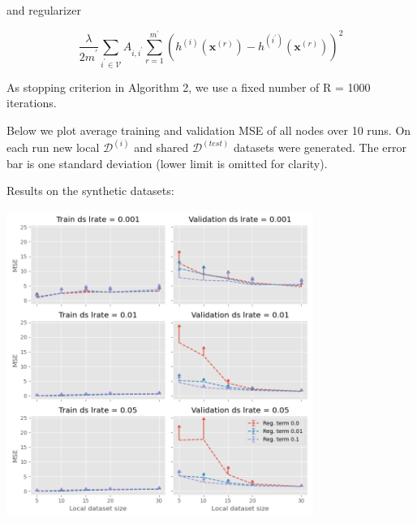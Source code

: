 \documentclass{article}
\begin{document}
and  regularizer 

\begin{equation}
\frac{\lambda}{{2m}^{'}} \sum_{{i}^{'} \in {\mathcal V}} {A}_{i,{i}^{'}} \sum_{r=1}^{{m}^{'}} \left({h}^{(i)}(\mathbf{x}^{(r)}) - {h}^{({i}^{'})}(\mathbf{x}^{(r)}) \right)^2
\end{equation}

As stopping criterion in Algorithm 2, we use a fixed number of R = 1000 iterations. 

Below we plot average training and validation MSE of all nodes over 10 runs. On each run new local $\mathcal{D}^{(i)}$ and shared $\mathcal{D}^{(test)}$ datasets were generated. The error bar is one standard deviation (lower limit is omitted for clarity).  

Results on the synthetic datasets:

\includegraphics[width=10cm]{linreg_syn_I_ds_lrate.png}
\end{document}
